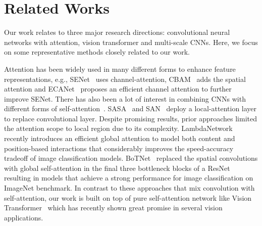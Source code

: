 \documentclass[10pt,twocolumn,letterpaper]{article}
\newcommand{\myparagraphfirst}[1]{\vspace{0mm} \noindent {\textbf{#1}}}
\begin{document}
     \section{Related Works}
\label{sec:related_works}

Our work relates to three major research directions: convolutional neural networks with attention, vision transformer and multi-scale CNNs. Here, we focus on some representative methods closely related to our work.

\vspace{0.5mm}
\myparagraphfirst{CNN with Attention.} Attention has been widely used in many different forms to enhance feature representations, e.g., SENet~\cite{SENet_Hu_2018} uses channel-attention, CBAM~\cite{CBAM_Woo_2018_ECCV} adds the spatial attention and ECANet~\cite{ECA_wang2020} proposes an efficient channel attention to further improve SENet. There has also been a lot of interest in combining CNNs with different forms of self-attention~\cite{lambdanetworks_bello2021,BoT_srinivas2021,SAN_Zhao_2020_CVPR,SASA_Ramachandran_2019_NeurIPS,bello2019attention,hu2019local,wang2018non}. SASA~\cite{SASA_Ramachandran_2019_NeurIPS} and SAN~\cite{SAN_Zhao_2020_CVPR} deploy a local-attention layer to replace convolutional layer. Despite promising results, prior approaches limited the attention scope to local region due to its complexity. LambdaNetwork~\cite{lambdanetworks_bello2021} recently introduces an efficient global attention to model both content and position-based interactions that considerably improves the speed-accuracy tradeoff of image classification models.
BoTNet~\cite{BoT_srinivas2021} replaced the spatial convolutions with global self-attention in the final three bottleneck blocks of a ResNet resulting in models that achieve a strong performance for image classification on ImageNet benchmark.
In contrast to these approaches that mix convolution with self-attention, our work is built on top of pure self-attention network like Vision Transformer~\cite{ViT_dosovitskiy2021an} which has recently shown great promise in several vision applications. 
\end{document}
